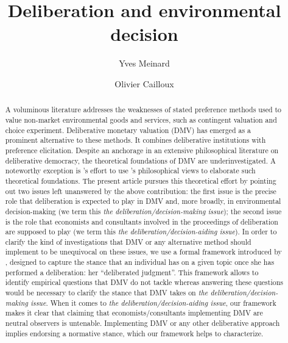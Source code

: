 \documentclass[version=3.21, pagesize, twoside=off, bibliography=totoc, DIV=calc, fontsize=12pt, a4paper, french, english]{scrartcl}
\newcommand{\institute}[1]{}
\newcommand{\keywords}[1]{}
\begin{document}
\title{Deliberation and environmental decision}
\author{Yves Meinard \and Olivier Cailloux}
\institute{
	Yves Meinard
	\and
	Olivier Cailloux 
	\at 
	Université Paris-Dauphine, \\
	PSL Research University, \\
	CNRS, \\
	LAMSADE\\
	75016 PARIS, FRANCE\\
	\email{olivier.cailloux@dauphine.fr}
}
\makeatletter
\makeatother
\maketitle

\keywords{decision aid, justification, empirical validation, methodology}

\begin{abstract}
A voluminous literature addresses the weaknesses of stated preference methods used to value non-market environmental goods and services, such as contingent valuation and choice experiment. 
Deliberative monetary valuation (DMV) has emerged as a prominent alternative to these methods. It combines deliberative institutions with preference elicitation. 
Despite an anchorage in an extensive philosophical literature on deliberative democracy, the theoretical foundations of DMV are underinvestigated.  
A noteworthy exception is \citeauthor{bartkowski_beyond_2018}'s effort to use \citeauthor{sen_idea_2009}'s philosophical views to elaborate such theoretical foundations. 
The present article pursues this theoretical effort by pointing out two issues left unanswered by the above contribution: 
the first issue is the precise role that deliberation is expected to play in DMV and, more broadly, in environmental decision-making (we term this \emph{the deliberation/decision-making issue}); 
the second issue is the role that economists and consultants involved in the proceedings of deliberation are supposed to play (we term this \emph{the deliberation/decision-aiding issue}). 
In order to clarify the kind of investigations that DMV or any alternative method should implement to be unequivocal on these issues, we use a formal framework introduced by \citeauthor{cailloux_formal_2018}, designed to capture the stance that an individual has on a given topic once she has performed a deliberation: her ``deliberated judgment''. 
This framework allows to identify empirical questions that DMV do not tackle whereas answering these questions would be necessary to clarify the stance that DMV takes on \emph{the deliberation/decision-making issue}. 
When it comes to \emph{the deliberation/decision-aiding issue}, our framework makes it clear that claiming that economists/consultants implementing DMV are neutral observers is untenable. 
Implementing DMV or any other deliberative approach implies endorsing a normative stance, which our framework helps to characterize.
\end{abstract}
\end{document}
